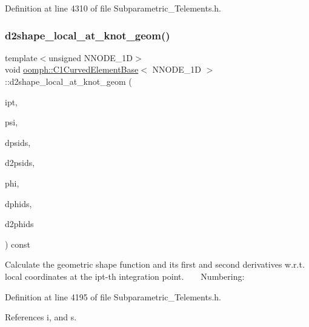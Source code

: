 Definition at line 4310 of file Subparametric\+\_\+\+Telements.\+h.

\mbox{\label{classoomph_1_1C1CurvedElementBase_afa7d51d3ec5a690371ee392a0ec98ba9}} 
\subsubsection{\texorpdfstring{d2shape\+\_\+local\+\_\+at\+\_\+knot\+\_\+geom()}{d2shape\_local\_at\_knot\_geom()}}
{\footnotesize\ttfamily template$<$unsigned N\+N\+O\+D\+E\+\_\+1D$>$ \\
void \hyperlink{classoomph_1_1C1CurvedElementBase}{oomph\+::\+C1\+Curved\+Element\+Base}$<$ N\+N\+O\+D\+E\+\_\+1D $>$\+::d2shape\+\_\+local\+\_\+at\+\_\+knot\+\_\+geom (\begin{DoxyParamCaption}\item[{const unsigned \&}]{ipt,  }\item[{\hyperlink{classoomph_1_1Shape}{Shape} \&}]{psi,  }\item[{\hyperlink{classoomph_1_1DShape}{D\+Shape} \&}]{dpsids,  }\item[{\hyperlink{classoomph_1_1DShape}{D\+Shape} \&}]{d2psids,  }\item[{\hyperlink{classoomph_1_1Shape}{Shape} \&}]{phi,  }\item[{\hyperlink{classoomph_1_1DShape}{D\+Shape} \&}]{dphids,  }\item[{\hyperlink{classoomph_1_1DShape}{D\+Shape} \&}]{d2phids }\end{DoxyParamCaption}) const\hspace{0.3cm}{\ttfamily [inline]}}

Calculate the geometric shape function and its first and second derivatives w.\+r.\+t. local coordinates at the ipt-\/th integration point. ~\newline
~\newline
 Numbering\+: 

Definition at line 4195 of file Subparametric\+\_\+\+Telements.\+h.



References i, and s.

